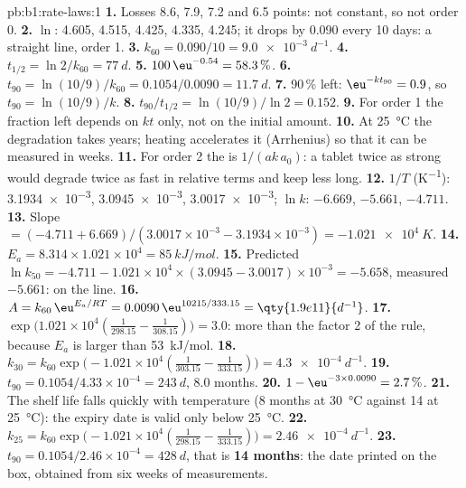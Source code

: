 \begin{solution}{pb:b1:rate-laws:1}
\textbf{1.} Losses 8.6, 7.9, 7.2 and 6.5 points: not constant, so not
order 0.
\textbf{2.} $\ln$: 4.605, 4.515, 4.425, 4.335, 4.245; it drops by 0.090
every 10 days: a straight line, order 1.
\textbf{3.} $k_{60} = 0.090/10 = \qty{9.0e-3}{d^{-1}}$.
\textbf{4.} $t_{1/2} = \ln2/k_{60} = \qty{77}{d}$.
\textbf{5.} $100\,\eu^{-0.54} = 58.3\,\%$.
\textbf{6.} $t_{90} = \ln(10/9)/k_{60} = 0.1054/0.0090 = \qty{11.7}{d}$.
\textbf{7.} 90\,\% left: $\eu^{-kt_{90}} = 0.9$, so $t_{90} = \ln(10/9)/k$.
\textbf{8.} $t_{90}/t_{1/2} = \ln(10/9)/\ln2 = 0.152$.
\textbf{9.} For order 1 the fraction left depends on $kt$ only, not on the
initial amount.
\textbf{10.} At \qty{25}{\celsius} the degradation takes years; heating
accelerates it (Arrhenius) so that it can be measured in weeks.
\textbf{11.} For order 2 the  is $1/(ak\,a_0)$: a tablet twice as
strong would degrade twice as fast in relative terms and keep less long.
\textbf{12.} $1/T$ (\unit{K^{-1}}): \num{3.1934e-3}, \num{3.0945e-3},
\num{3.0017e-3}; $\ln k$: $-6.669$, $-5.661$, $-4.711$.
\textbf{13.} Slope $= (-4.711 + 6.669)/(3.0017 \times 10^{-3} - 3.1934 \times
10^{-3}) = \qty{-1.021e4}{K}$.
\textbf{14.} $E_a = 8.314 \times 1.021 \times 10^4 = \qty{85}{kJ/mol}$.
\textbf{15.} Predicted $\ln k_{50} = -4.711 - 1.021 \times 10^4 \times (3.0945 -
3.0017) \times 10^{-3} = -5.658$, measured $-5.661$: on the line.
\textbf{16.} $A = k_{60}\,\eu^{E_a/RT} = 0.0090\,\eu^{10215/333.15} =
\qty{1.9e11}{d^{-1}}$.
\textbf{17.} $\exp\big(1.021 \times 10^4(\frac{1}{298.15} -
\frac{1}{308.15})\big) = 3.0$: more than the factor 2 of the rule, because
$E_a$ is larger than \qty{53}{kJ/mol}.
\textbf{18.} $k_{30} = k_{60}\exp\big(-1.021 \times 10^4(\frac{1}{303.15} -
\frac{1}{333.15})\big) = \qty{4.3e-4}{d^{-1}}$.
\textbf{19.} $t_{90} = 0.1054/4.33 \times 10^{-4} = \qty{243}{d}$, 8.0
months.
\textbf{20.} $1 - \eu^{-3 \times 0.0090} = 2.7\,\%$.
\textbf{21.} The shelf life falls quickly with temperature (8 months at
\qty{30}{\celsius} against 14 at \qty{25}{\celsius}): the expiry date is
valid only below \qty{25}{\celsius}.
\textbf{22.} $k_{25} = k_{60}\exp\big(-1.021 \times 10^4(\frac{1}{298.15} -
\frac{1}{333.15})\big) = \qty{2.46e-4}{d^{-1}}$.
\textbf{23.} $t_{90} = 0.1054/2.46 \times 10^{-4} = \qty{428}{d}$, that
is \textbf{14 months}: the date printed on the box, obtained from six
weeks of measurements.
\end{solution}
